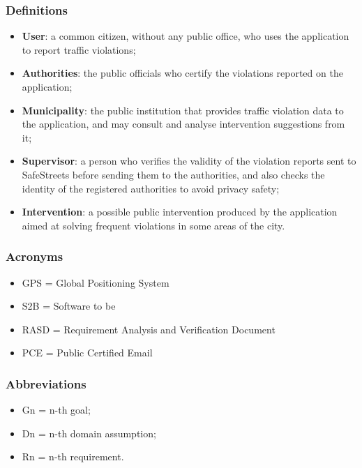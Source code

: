 \subsubsection{Definitions}
	\begin{itemize}
		\item \textbf{User}: a common citizen, without any public office, who uses the application to report traffic violations;
		\item \textbf{Authorities}: the public officials who certify the violations reported on the application;
		\item \textbf{Municipality}: the public institution that provides traffic violation data to the application, and may consult and analyse intervention suggestions from it;
		\item \textbf{Supervisor}: a person who verifies the validity of the violation reports sent to SafeStreets before sending them to the authorities, and also checks the identity of the registered authorities to avoid privacy safety;
		\item \textbf{Intervention}: a possible public intervention produced by the application aimed at solving frequent violations in some areas of the city.
	\end{itemize}
\subsubsection{Acronyms}
\begin{itemize}
	\item GPS = Global Positioning System
	\item S2B = Software to be
	\item RASD = Requirement Analysis and Verification Document
	\item PCE = Public Certified Email
\end{itemize}
\subsubsection{Abbreviations}
\begin{itemize}
	\item Gn = n-th goal;
	\item Dn = n-th domain assumption;
	\item Rn = n-th requirement.
\end{itemize}